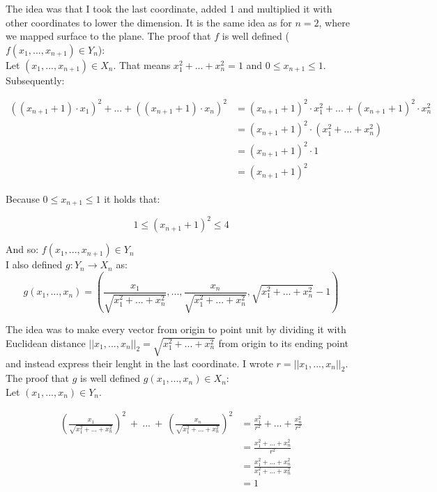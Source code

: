 \documentclass[12pt]{article}
\begin{document}
\noindent The idea was that I took the last coordinate, added 1 and multiplied it with other coordinates to lower the dimension. It is the same idea as for $n=2$, where we mapped surface to the plane. The proof that $f$ is well defined ($f(x_{1},...,x_{n+1}) \in Y_{n}$): \\

\noindent Let $(x_{1},...,x_{n+1}) \in X_{n}$. That means $x_{1}^2 + ... + x_{n}^2 = 1$ and $0 \leq x_{n+1} \leq 1$. Subsequently: 

	\begin{align*}
((x_{n+1} + 1) \cdot x_{1})^2 + ... +  ((x_{n+1} + 1) \cdot x_{n})^2
&= (x_{n+1} + 1)^2 \cdot x_{1}^2 + ... +  (x_{n+1} + 1)^2 \cdot x_{n}^2  \\
&= (x_{n+1} + 1)^2 \cdot (x_1^2 + ... + x_n^2) \\
&=  (x_{n+1} + 1)^2 \cdot 1 \\
&=  (x_{n+1} + 1)^2 
\end{align*}

\noindent Because $0 \leq x_{n+1} \leq 1$ it holds that: 

$$1 \leq (x_{n+1} + 1)^2  \leq 4$$

\noindent And so: $f(x_{1},...,x_{n+1}) \in Y_{n}$ \\



\noindent I also defined $g: Y_{n} \rightarrow X_{n}$ as:  \\
$$g(x_{1},...,x_{n}) = (\frac{x_1}{\sqrt{x_1^2 + ... + x_n^2}}, ... ,  \frac{x_n}{\sqrt{x_1^2 + ... + x_n^2}}, \sqrt{x_1^2 + ... + x_n^2} - 1)$$

\noindent The idea was to make every vector from origin to point unit by dividing it with Euclidean distance $||x_{1},...,x_{n}||_2 = \sqrt{x_1^2 + ... + x_n^2}$ from origin to its ending point and instead express their lenght in the last coordinate. I wrote $r =||x_{1},...,x_{n}||_2$. The proof that $g$ is well defined $g(x_{1},...,x_{n}) \in X_{n}$: \\

\noindent Let $(x_{1},...,x_{n}) \in Y_{n}$. 

\begin{align*} 
	\left(\frac{x_1}{\sqrt{x_1^2 + ... + x_n^2}}\right) ^2 \ + \ ... \ + \ \left(\frac{x_n}{\sqrt{x_1^2 + ... + x_n^2}}\right)^2
	&= \frac{x_1^2}{r^2} + ... + \frac{x_n^2}{r^2} \\
	&= \frac{x_1^2 + ... + x_n^2}{r^2}	\\
	&= \frac{x_1^2 + ... + x_n^2}{x_1^2 + ... + x_n^2} \\
	&= 1
\end{align*}
\end{document}
